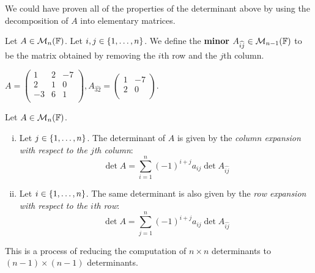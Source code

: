 \documentclass[a4paper]{article}
\begin{document}
\begin{remark}
	We could have proven all of the properties of the determinant above by using the decomposition of $ A $ into elementary matrices.
\end{remark}

\begin{definition}
	Let $ A \in {\mathcal{M}}_n({\mathbb{F}}) $.
	Let $ i, j \in \qty{1, \dots, n} $.
	We define the \textbf{minor} $ A_{\widehat{ij}} \in {\mathcal{M}}_{n-1}({\mathbb{F}}) $ to be the matrix obtained by removing the $ i $th row and the $ j $th column.
\end{definition}

\begin{example}
	$ A = \begin{pmatrix}
		1 & 2 &  -7 \\
		2 & 1 &  0 \\
		-3 & 6 &  1 \\
	\end{pmatrix}, A_{\widehat{32}} = \begin{pmatrix}
		1 &  -7 \\
		2 &  0 \\
	\end{pmatrix} $. 
\end{example}

\begin{lemma}
	Let $ A \in {\mathcal{M}}_n({\mathbb{F}}) $.
	\begin{enumerate}[(i)]
		\item Let $ j \in \qty{1, \dots, n} $.
		      The determinant of $ A $ is given by the \textit{column expansion with respect to the $ j $th column}:
		      \[
			      \det A = \sum_{i=1}^n (-1)^{i+j} a_{ij} \det A_{\widehat{ij}}
		      \]
		\item Let $ i \in \qty{1, \dots, n} $.
		      The same determinant is also given by the \textit{row expansion with respect to the $ i $th row}:
		      \[
			      \det A = \sum_{j=1}^n (-1)^{i+j} a_{ij} \det A_{\widehat{ij}}
		      \]
	\end{enumerate}
	This is a process of reducing the computation of $ n \times n $ determinants to $ (n-1) \times (n-1) $ determinants.
\end{lemma}
\end{document}

